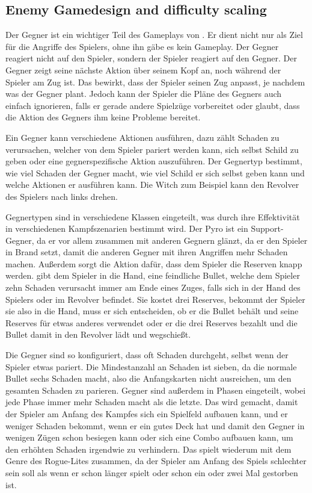 \subsection{Enemy Gamedesign and difficulty scaling}\label{subsec:placementMatters}

Der Gegner ist ein wichtiger Teil des Gameplays von \FF. Er dient nicht nur als Ziel für die Angriffe des Spielers, ohne ihn gäbe es kein Gameplay.
Der Gegner reagiert nicht auf den Spieler, sondern der Spieler reagiert auf den Gegner. Der Gegner zeigt seine nächste Aktion über seinem Kopf an, noch während der Spieler am Zug ist.
Das bewirkt, dass der Spieler seinen Zug anpasst, je nachdem was der Gegner plant. Jedoch kann der Spieler die Pläne des Gegners auch einfach ignorieren,
falls er gerade andere Spielzüge vorbereitet oder glaubt, dass die Aktion des Gegners ihm keine Probleme bereitet.


Ein Gegner kann verschiedene Aktionen ausführen, dazu zählt Schaden zu verursachen, welcher von dem Spieler pariert
werden kann, sich selbst Schild zu geben oder eine gegnerspezifische Aktion auszuführen. Der Gegnertyp bestimmt,
wie viel Schaden der Gegner macht, wie viel Schild er sich selbst geben kann und welche Aktionen er ausführen kann.
Die Witch zum Beispiel kann den Revolver des Spielers nach links drehen.


Gegnertypen sind in verschiedene Klassen eingeteilt,
was durch ihre Effektivität in verschiedenen Kampfszenarien bestimmt wird. Der Pyro ist ein Support-Gegner, da er vor
allem zusammen mit anderen Gegnern glänzt, da er den Spieler in Brand setzt, damit die anderen Gegner mit ihren Angriffen
mehr Schaden machen. Außerdem sorgt die Aktion  dafür, dass dem Spieler die Reserven knapp werden. 
gibt dem Spieler  in die Hand, eine feindliche Bullet, welche dem Spieler zehn Schaden verursacht immer am
Ende eines Zuges, falls sich  in der Hand des Spielers oder im Revolver befindet. Sie kostet drei Reserves,
bekommt der Spieler sie also in die Hand, muss er sich entscheiden, ob er die Bullet behält und seine Reserves für etwas anderes
verwendet oder er die drei Reserves bezahlt und die Bullet damit in den Revolver lädt und wegschießt.


Die Gegner sind so konfiguriert, dass oft Schaden durchgeht, selbst wenn der Spieler etwas pariert. Die Mindestanzahl
an Schaden ist sieben, da die normale Bullet sechs Schaden macht, also die Anfangskarten nicht ausreichen, um den gesamten
Schaden zu parieren. Gegner sind außerdem in Phasen eingeteilt, wobei jede Phase immer mehr Schaden macht als die letzte.
Das wird gemacht, damit der Spieler am Anfang des Kampfes sich ein Spielfeld aufbauen kann, und er weniger Schaden bekommt,
wenn er ein gutes Deck hat und damit den Gegner in wenigen Zügen schon besiegen kann oder sich eine Combo aufbauen kann,
um den erhöhten Schaden irgendwie zu verhindern. Das spielt wiederum mit dem Genre des Rogue-Lites zusammen,
da der Spieler am Anfang des Spiels schlechter sein soll als wenn er schon länger spielt oder schon ein oder zwei Mal gestorben ist.


